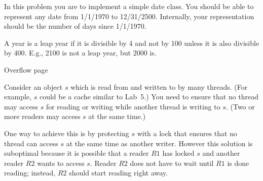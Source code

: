 \documentclass[11pt]{exam}
\begin{document}
\begin{questions}
\begin{parts}
\end{parts}

\newpage


In this problem you are to implement a simple date class. 
You should be able to 
represent any date from 1/1/1970  to 12/31/2500.
Internally, your representation should be the number
of days since 1/1/1970. 

A year is a leap year if it is divisible by 4 and not by 100
unless it is also divisible by 400. E.g., 2100 is not
a leap year, but 2000 is.


\newpage

Overflow page

\newpage



Consider an object $s$ which is read from and written to by many threads.
(For example, $s$ could be a cache similar to Lab~5.)
You need to ensure that no thread may access $s$
for reading or writing while another thread is writing to $s$.
(Two or more readers may access $s$ at the same time.)

One way to achieve this is by
protecting $s$ with a lock that ensures that no thread can access $s$ at the same
time as another writer.
However this solution is suboptimal because it is possible that a reader $R1$ has
locked $s$ and another reader $R2$ wants to access $s$.
Reader $R2$ does not have to wait until $R1$ is done reading; instead, $R2$
should start reading right away.


\end{questions}
\end{document}
